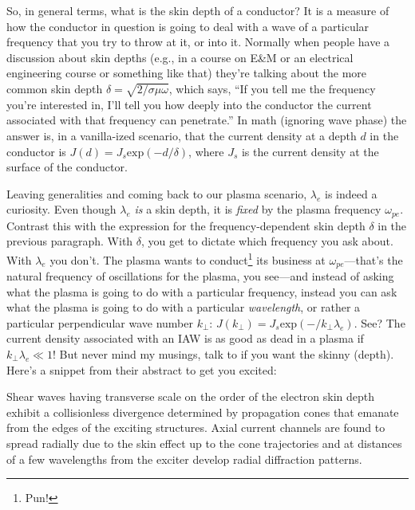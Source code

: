 So, in general terms, what is the skin depth of a conductor? It is a measure of
how the conductor in question is going to deal with a wave of a particular
frequency that you try to throw at it, or into it. Normally when people have a
discussion about skin depths (e.g., in a course on E\&M or an electrical
engineering course or something like that) they're talking about the more common
skin depth $\delta = \sqrt{2 / \sigma \mu \omega}$, which says, ``If you tell me
the frequency you're interested in, I'll tell you how deeply into the conductor
the current associated with that frequency can penetrate.'' In math (ignoring
wave phase) the answer is, in a vanilla-ized scenario, that the current density
at a depth $d$ in the conductor is $J (d) = J_s \mathrm{exp} ( - d / \delta )$,
where $J_s$ is the current density at the surface of the conductor.

Leaving generalities and coming back to our plasma scenario, $\lambda_e$ is
indeed a curiosity. Even though $\lambda_e$ \emph{is} a skin depth, it is
\emph{fixed} by the plasma frequency $\omega_{pe}$. Contrast this with the
expression for the frequency-dependent skin depth $\delta$ in the previous
paragraph. With $\delta$, you get to dictate which frequency you ask about. With
$\lambda_e$ you don't. The plasma wants to conduct\footnote{Pun!} its business
at $\omega_{pe}$---that's the natural frequency of oscillations for the plasma,
you see---and instead of asking what the plasma is going to do with a particular
frequency, instead you can ask what the plasma is going to do with a particular
\emph{wavelength}, or rather a particular perpendicular wave number $k_\perp$:
$J ( k_\perp ) = J_s \mathrm{exp} ( - / k_\perp \lambda_e )$.  See? The current
density associated with an IAW is as good as dead in a plasma if $k_\perp
\lambda_e \ll 1$! But never mind my musings, talk to \citet{Morales1994} if you
want the skinny (depth). Here's a snippet from their abstract to get you
excited:

\begin{displayquote}
  Shear \Alf waves having transverse scale on the order of the electron skin
  depth exhibit a collisionless divergence determined by propagation cones that
  emanate from the edges of the exciting structures. Axial current channels are
  found to spread radially due to the skin effect up to the cone trajectories
  and at distances of a few wavelengths from the exciter develop radial
  diffraction patterns.
\end{displayquote}

